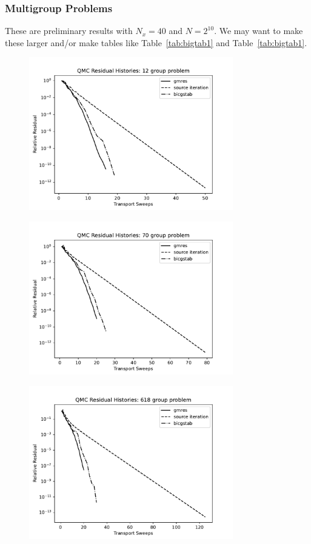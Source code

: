 \subsubsection{Multigroup Problems}

These are preliminary results with $N_x = 40$ and $N=2^{10}$. We may
want to make these larger and/or make tables like 
Table~\ref{tab:bigtab1} and Table~\ref{tab:bigtab1}. 

\begin{figure}[h]
\centerline{
\includegraphics[width=3.5in]{FIGURES/12Group.pdf}
}
\caption{\label{fig:12group}}
\end{figure}

\begin{figure}[h]
\centerline{
\includegraphics[width=3.5in]{FIGURES/70Group.pdf}
}
\caption{\label{fig:70group}}
\end{figure}

\begin{figure}[h]
\centerline{
\includegraphics[width=3.5in]{FIGURES/618Group.pdf}
}
\caption{\label{fig:618group}}
\end{figure}


